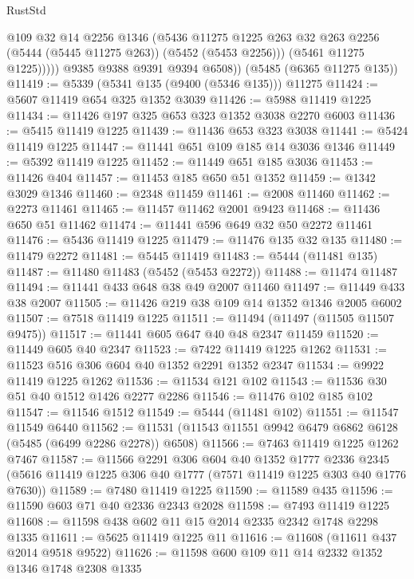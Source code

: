 \begin{lexlean}{RustStd}
\begin{coremodule}
                @109
                @32
                @14
                @2256
                @1346
                (@5436
                  @11275
                  @1225
                  @263
                  @32
                  @263
                  @2256
                  (@5444 (@5445 @11275 @263))
                  (@5452 (@5453 @2256)))
                (@5461 @11275 @1225)))))
        @9385
        @9388
        @9391
        @9394
        @6508))
    (@5485 (@6365 @11275 @135))
@11419 := @5339 (@5341 @135 (@9400 (@5346 @135))) @11275
@11424 := @5607 @11419 @654 @325 @1352 @3039
@11426 := @5988 @11419 @1225
@11434 := @11426 @197 @325 @653 @323 @1352 @3038 @2270 @6003
@11436 := @5415 @11419 @1225
@11439 := @11436 @653 @323 @3038
@11441 := @5424 @11419 @1225
@11447 := @11441 @651 @109 @185 @14 @3036 @1346
@11449 := @5392 @11419 @1225
@11452 := @11449 @651 @185 @3036
@11453 := @11426 @404
@11457 := @11453 @185 @650 @51 @1352
@11459 := @1342 @3029 @1346
@11460 := @2348 @11459
@11461 := @2008 @11460
@11462 := @2273 @11461
@11465 := @11457 @11462 @2001 @9423
@11468 := @11436 @650 @51 @11462
@11474 := @11441 @596 @649 @32 @50 @2272 @11461
@11476 := @5436 @11419 @1225
@11479 := @11476 @135 @32 @135
@11480 := @11479 @2272
@11481 := @5445 @11419
@11483 := @5444 (@11481 @135)
@11487 := @11480 @11483 (@5452 (@5453 @2272))
@11488 := @11474 @11487
@11494 := @11441 @433 @648 @38 @49 @2007 @11460
@11497 := @11449 @433 @38 @2007
@11505 := @11426 @219 @38 @109 @14 @1352 @1346 @2005 @6002
@11507 := @7518 @11419 @1225
@11511 := @11494 (@11497 (@11505 @11507 @9475))
@11517 := @11441 @605 @647 @40 @48 @2347 @11459
@11520 := @11449 @605 @40 @2347
@11523 := @7422 @11419 @1225 @1262
@11531 := @11523 @516 @306 @604 @40 @1352 @2291 @1352 @2347
@11534 := @9922 @11419 @1225 @1262
@11536 := @11534 @121 @102
@11543 := @11536 @30 @51 @40 @1512 @1426 @2277 @2286
@11546 := @11476 @102 @185 @102
@11547 := @11546 @1512
@11549 := @5444 (@11481 @102)
@11551 := @11547 @11549 @6440
@11562 := @11531 (@11543 @11551 @9942 @6479 @6862 @6128 (@5485 (@6499 @2286 @2278)) @6508)
@11566 := @7463 @11419 @1225 @1262 @7467
@11587 := @11566
    @2291
    @306
    @604
    @40
    @1352
    @1777
    @2336
    @2345
    (@5616 @11419 @1225 @306 @40 @1777 (@7571 @11419 @1225 @303 @40 @1776 @7630))
@11589 := @7480 @11419 @1225
@11590 := @11589 @435
@11596 := @11590 @603 @71 @40 @2336 @2343 @2028
@11598 := @7493 @11419 @1225
@11608 := @11598 @438 @602 @11 @15 @2014 @2335 @2342 @1748 @2298 @1335
@11611 := @5625 @11419 @1225 @11
@11616 := @11608 (@11611 @437 @2014 @9518 @9522)
@11626 := @11598 @600 @109 @11 @14 @2332 @1352 @1346 @1748 @2308 @1335

\end{coremodule}
\end{lexlean}
